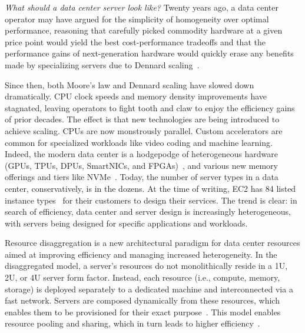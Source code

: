 \documentclass[12pt]{ucsddissertation}
\begin{document}
\begin{dissertationintroduction}


\textit{What should a data center server look like?} Twenty years ago, a data center operator may
have argued for the simplicity of homogeneity over optimal performance, reasoning that carefully
picked commodity hardware at a given price point would yield the best cost-performance tradeoffs and that the
performance gains of next-generation hardware would quickly erase any benefits made by specializing
servers due to Dennard scaling~\cite{moore}.

Since then, both Moore's law and Dennard scaling have slowed down dramatically. CPU clock speeds and
memory density improvements have stagnated, leaving operators to fight tooth and claw to enjoy the
efficiency gains of prior decades. The effect is that new technologies are being introduced to
achieve scaling. CPUs are now monstrously parallel. Custom accelerators are common for specialized
workloads like video coding and machine learning. Indeed, the modern data center is a hodgepodge of
heterogeneous hardware (GPUs, TPUs, DPUs, SmartNICs, and
FPGAs)~\cite{dsnf,azure-smartnic,tpu,nitro}, and various new memory offerings and tiers like
NVMe~\cite{decible}. Today, the number of server types in a data center, conservatively, is in the
dozens. At the time of writing, EC2 has 84 listed instance types~\cite{ec2-offer} for their
customers to design their services. The trend is clear: in search of efficiency, data center and
server design is increasingly heterogeneous, with servers being designed for specific applications
and workloads.

Resource disaggregation is a new architectural paradigm for data center resources aimed at improving
efficiency and managing increased heterogeneity. In the disaggregated model, a server's resources do
not monolithically reside in a 1U, 2U, or 4U server form factor. Instead, each resource (i.e.,
compute, memory, storage) is deployed separately to a dedicated machine and interconnected via a
fast network. Servers are composed dynamically from these resources, which enables them to be
provisioned for their exact purpose~\cite{disandapp,infiniswap,blade-server,decible,legoos}. This
model enables resource pooling and sharing, which in turn leads to higher
efficiency~\cite{regions,fastswap,dsnf,aifm,supernic,ditto}.




\end{dissertationintroduction}
\end{document}
